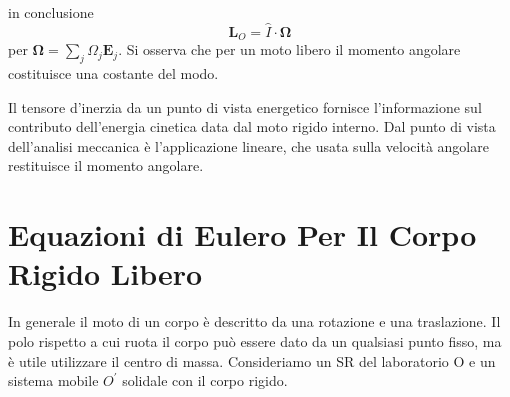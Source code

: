 in conclusione 
\begin{equation}
	\bm{L}_{O} = \hat{I}\cdot \bm{\Omega}
\end{equation}
per $\bm{\Omega} = \sum_{j} \Omega_j \bm{E}_{j}$. Si osserva che per un moto libero il momento angolare costituisce una costante del modo. 
\begin{remark}
Il tensore d'inerzia da un punto di vista energetico fornisce l'informazione sul contributo dell'energia cinetica data dal moto rigido interno. Dal punto di vista dell'analisi meccanica \`{e} l'applicazione lineare, che usata sulla velocit\`{a} angolare restituisce il momento angolare.	
\end{remark}

\section{Equazioni di Eulero Per Il Corpo Rigido Libero}
In generale il moto di un corpo \`{e} descritto da una rotazione e una traslazione. Il polo rispetto a cui ruota il corpo pu\`{o} essere dato da un qualsiasi punto fisso, ma \`{e} utile utilizzare il centro di massa. Consideriamo un SR del laboratorio O e un sistema mobile $O^{\prime}$ solidale con il corpo rigido.

